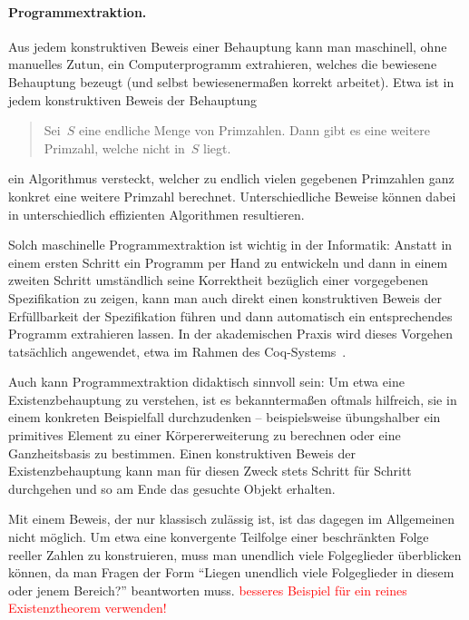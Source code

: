 \documentclass[a4paper,ngerman,12pt]{scrartcl}
\theoremstyle{definition}
\theoremstyle{plain}
\theoremstyle{remark}
\renewcommand{\_}{\mathpunct{.}\,}
\newcommand{\?}{\,{:}\,}
\newcommand{\XXX}[1]{\textcolor{red}{#1}}
\begin{document}
\paragraph{Programmextraktion.} Aus jedem konstruktiven Beweis einer Behauptung
kann man maschinell, ohne manuelles Zutun, ein Computerprogramm extrahieren,
welches die bewiesene Behauptung bezeugt (und selbst bewiesenermaßen korrekt
arbeitet). Etwa ist in jedem konstruktiven Beweis der Behauptung
\begin{quote}Sei~$S$ eine endliche Menge von Primzahlen. Dann gibt es eine
weitere Primzahl, welche nicht in~$S$ liegt.\end{quote}
ein Algorithmus versteckt, welcher zu endlich vielen gegebenen Primzahlen
ganz konkret eine weitere Primzahl berechnet. Unterschiedliche Beweise können
dabei in unterschiedlich effizienten Algorithmen resultieren.

Solch maschinelle
Programmextraktion ist wichtig in der Informatik: Anstatt in einem ersten
Schritt ein Programm per Hand zu entwickeln und dann in einem zweiten
Schritt umständlich seine Korrektheit bezüglich einer vorgegebenen
Spezifikation zu zeigen, kann man auch direkt einen konstruktiven Beweis der
Erfüllbarkeit der Spezifikation führen und dann automatisch ein entsprechendes
Programm extrahieren lassen. In der akademischen Praxis wird dieses Vorgehen
tatsächlich angewendet, etwa im Rahmen des Coq-Systems~\cite{coq:manual}.

Auch kann Programmextraktion didaktisch sinnvoll sein: Um etwa eine
Existenzbehauptung zu verstehen, ist es bekanntermaßen oftmals hilfreich, sie in einem konkreten
Beispielfall durchzudenken -- beispielsweise übungshalber ein primitives
Element zu einer Körpererweiterung zu berechnen oder eine Ganzheitsbasis zu
bestimmen. Einen konstruktiven Beweis der Existenzbehauptung
kann man für diesen Zweck stets Schritt für Schritt durchgehen und so am Ende das gesuchte
Objekt erhalten.

Mit einem Beweis, der nur klassisch zulässig ist, ist das
dagegen im Allgemeinen nicht möglich. Um etwa eine konvergente Teilfolge einer
beschränkten Folge reeller Zahlen zu konstruieren, muss man unendlich viele
Folgeglieder überblicken können, da man Fragen der Form "`Liegen unendlich
viele Folgeglieder in diesem oder jenem Bereich?"' beantworten muss.
\XXX{besseres Beispiel für ein reines Existenztheorem verwenden!}
\end{document}
